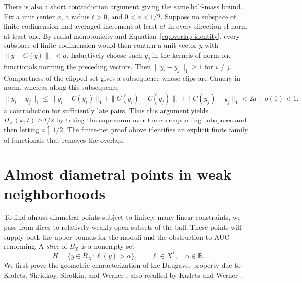 \begin{remark}\label{rem:separated}
There is also a short contradiction argument giving the same half-mass
bound. Fix a unit center $x$, a radius $t>0$, and $0<a<1/2$.
Suppose no subspace of finite codimension had averaged increment at
least $at$ in every direction of norm at least one. By radial monotonicity and
Equation~\eqref{eq:overlap-identity}, every subspace of finite
codimension would then contain a unit vector $y$ with
$\|y-C(y)\|_1<a$. Inductively choose such $y_j$ in the kernels of
norm-one functionals norming the preceding vectors.  Then
$\|y_i-y_j\|_1\ge1$ for $i\ne j$.  Compactness of the clipped set gives
a subsequence whose clips are Cauchy in norm, whereas along this
subsequence
\[
 \|y_i-y_j\|_1
 \le\|y_i-C(y_i)\|_1+\|C(y_i)-C(y_j)\|_1
          +\|C(y_j)-y_j\|_1<2a+o(1)<1,
\]
a contradiction for sufficiently late pairs. Thus this argument yields
$H_E(x,t)\ge t/2$ by taking the supremum over the corresponding subspaces
and then letting $a\uparrow1/2$. The finite-net proof above identifies
an explicit finite family of functionals that removes the overlap.
\end{remark}

\section{Almost diametral points in weak neighborhoods}\label{sec:weak-neighborhoods}

To find almost diametral points subject to finitely many linear
constraints, we pass from slices to relatively weakly open subsets of
the ball. These points will supply both the upper bounds for the moduli
and the obstruction to AUC renorming. A \emph{slice} of $B_X$ is a nonempty set
\[
 H=\{y\in B_X:\ell(y)>\alpha\},\qquad
 \ell\in X^*,\quad\alpha\in\mathbb R.
\]
We first prove the geometric characterization of the Daugavet property
due to Kadets, Shvidkoy, Sirotkin, and Werner
\cite[Lemma~2.2]{KSSW2000}, also recalled by Kadets and Werner
\cite[Lemma~1.1]{KW2004}.

